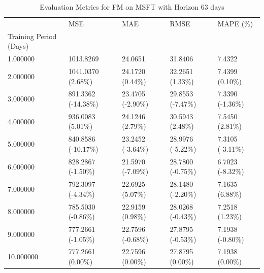 \begin{table}
\caption{Evaluation Metrics for FM on MSFT with Horizon 63 days}
\label{tab:fm_MSFT_h63_metrics}
\begin{tabular}{lllll}
\toprule
 & MSE & MAE & RMSE & MAPE (\%) \\
Training Period (Days) &  &  &  &  \\
\midrule
1.000000 & 1013.8269 & 24.0651 & 31.8406 & 7.4322 \\
2.000000 & 1041.0370 (2.68\%) & 24.1720 (0.44\%) & 32.2651 (1.33\%) & 7.4399 (0.10\%) \\
3.000000 & 891.3362 (-14.38\%) & 23.4705 (-2.90\%) & 29.8553 (-7.47\%) & 7.3390 (-1.36\%) \\
4.000000 & 936.0083 (5.01\%) & 24.1246 (2.79\%) & 30.5943 (2.48\%) & 7.5450 (2.81\%) \\
5.000000 & 840.8586 (-10.17\%) & 23.2452 (-3.64\%) & 28.9976 (-5.22\%) & 7.3105 (-3.11\%) \\
6.000000 & 828.2867 (-1.50\%) & 21.5970 (-7.09\%) & 28.7800 (-0.75\%) & 6.7023 (-8.32\%) \\
7.000000 & 792.3097 (-4.34\%) & 22.6925 (5.07\%) & 28.1480 (-2.20\%) & 7.1635 (6.88\%) \\
8.000000 & 785.5030 (-0.86\%) & 22.9159 (0.98\%) & 28.0268 (-0.43\%) & 7.2518 (1.23\%) \\
9.000000 & 777.2661 (-1.05\%) & 22.7596 (-0.68\%) & 27.8795 (-0.53\%) & 7.1938 (-0.80\%) \\
10.000000 & 777.2661 (0.00\%) & 22.7596 (0.00\%) & 27.8795 (0.00\%) & 7.1938 (0.00\%) \\
\bottomrule
\end{tabular}
\end{table}
